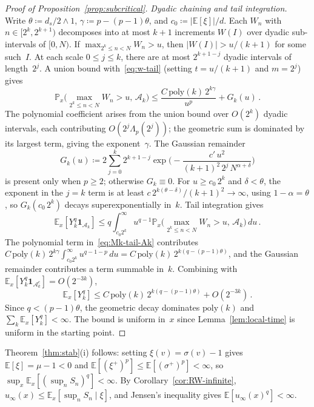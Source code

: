 \documentclass[11pt]{amsart}
\theoremstyle{plain}
\theoremstyle{definition}
\newcommand{\E}{\mathbb{E}}
\renewcommand{\P}{\mathbb{P}}
\newcommand{\one}{\mathbf{1}}
\begin{document}
\begin{proof}[Proof of Proposition~\textup{\ref{prop:subcritical}}]
		\emph{Dyadic chaining and tail integration.}
		Write $\theta\coloneqq d_s/2\wedge 1$, $\gamma\coloneqq p-(p-1)\theta$, and $c_0\coloneqq|\E[\xi]|/d$. Each $W_n$ with $n\in[2^k,2^{k+1})$ decomposes into at most $k{+}1$ increments $W(I)$ over dyadic sub-intervals of $[0,N)$. If $\max_{2^k\leq n<N}W_n>u$, then $|W(I)|>u/(k{+}1)$ for some such~$I$. At each scale $0\leq j\leq k$, there are at most $2^{k+1-j}$ dyadic intervals of length~$2^j$. A union bound with~\eqref{eq:w-tail} (setting $t=u/(k{+}1)$ and $m=2^j$) gives
		\begin{equation}\label{eq:Mk-tail-Ak}
			\P_x\bigl(\max_{2^k\leq n<N}W_n>u,\,\mathcal{A}_k\bigr)
			\leq\frac{C\,\mathrm{poly}(k)\,2^{k\gamma}}{u^p}+G_k(u)\,.
		\end{equation}
		The polynomial coefficient arises from the union bound over $O(2^k)$ dyadic intervals, each contributing $O(2^j\Lambda_p(2^j))$; the geometric sum is dominated by its largest term, giving the exponent~$\gamma$. The Gaussian remainder
		\[
		G_k(u)\coloneqq 2\sum_{j=0}^k 2^{k+1-j}\exp\biggl(-\frac{c'\,u^2}{(k{+}1)^2\,2^j\,N^{\alpha+\delta}}\biggr)
		\]
		is present only when $p\geq 2$; otherwise $G_k\equiv 0$. For $u\geq c_0\,2^k$ and $\delta<\theta$, the exponent in the $j=k$ term is at least $c\,2^{k(\theta-\delta)}/(k{+}1)^2\to\infty$, using $1-\alpha=\theta$, so $G_k(c_0\,2^k)$ decays superexponentially in~$k$.
		Tail integration gives
		\[
		\E_x[Y_k^q\one_{\mathcal{A}_k}]\leq q\int_{c_0 2^k}^\infty u^{q-1}\P_x\bigl(\max_{2^k\leq n<N}W_n>u,\,\mathcal{A}_k\bigr)\,du\,.
		\]
		The polynomial term in~\eqref{eq:Mk-tail-Ak} contributes $C\,\mathrm{poly}(k)\,2^{k\gamma}\int_{c_0 2^k}^\infty u^{q-1-p}\,du=C\,\mathrm{poly}(k)\,2^{k(q-(p-1)\theta)}$, and the Gaussian remainder contributes a term summable in~$k$. Combining with $\E_x[Y_k^q\one_{\mathcal{A}_k^c}]=O(2^{-3k})$,
		\[
		\E_x[Y_k^q]\leq C\,\mathrm{poly}(k)\,2^{k(q-(p-1)\theta)}+O(2^{-3k})\,.
		\]
		Since $q<(p-1)\theta$, the geometric decay dominates $\mathrm{poly}(k)$ and $\sum_k\E_x[Y_k^q]<\infty$. The bound is uniform in~$x$ since Lemma~\ref{lem:local-time} is uniform in the starting point.
	\end{proof}
	
	Theorem~\ref{thm:stab}(i) follows: setting $\xi(v)=\sigma(v)-1$ gives $\E[\xi]=\mu-1<0$ and $\E[(\xi^+)^p]\leq\E[(\sigma^+)^p]<\infty$, so $\sup_x\E_x[(\sup_n S_n)^q]<\infty$. By Corollary~\ref{cor:RW-infinite}, $u_\infty(x)\leq\E_x[\sup_n S_n\mid\xi]$, and Jensen's inequality gives $\E[u_\infty(x)^q]<\infty$.
	
\end{document}
